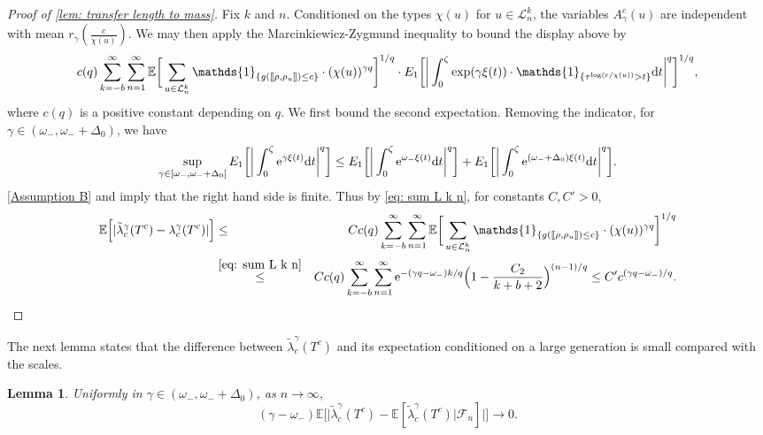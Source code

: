 \documentclass[12pt]{article}
\def\llbracket{[\hspace{-.10em} [ }
\def\rrbracket{ ] \hspace{-.10em}]}
\numberwithin{equation}{section}
\theoremstyle{plain}
\newtheorem{lem}[thm]{Lemma}
\theoremstyle{definition}
\begin{document}
\begin{proof}[Proof of \cref{lem: transfer length to mass}]
\noindent Fix $k$ and $n$. Conditioned on the types $\chi(u)$ for $u\in\mathcal{L}^k_n$, the variables $A_\gamma^c(u)$ are independent with mean $r_{\gamma}(\frac{c}{\chi(u)})$. We may then apply the Marcinkiewicz-Zygmund inequality to bound the display above by
\[
c(q)\sum^{\infty}_{k=-b}\sum^{\infty}_{n=1} \mathbb{E}\bigg[\sum_{u\in\mathcal{L}^k_n}\mathds{1}_{\{g(\llbracket \rho, \rho_u \rrbracket)\leq c\}}\cdot(\chi(u))^{\gamma q}\bigg]^{1/q} \cdot E_1\bigg[\bigg| \int^\zeta_0 \exp(\gamma\xi(t))\cdot\mathds{1}_{\{\tau^{\log(c/\chi(u))}>t\}}\mathrm{d}t \bigg|^q\bigg]^{1/q},
\]
where $c(q)$ is a positive constant depending on $q$. We first bound the second expectation. Removing the indicator, for $\gamma\in (\omega_-, \omega_- + \Delta_0)$, we have
\[
\sup_{\gamma\in[\omega_-, \omega_- + \Delta_0]}E_1\bigg[\bigg|\int^\zeta_0 \mathrm{e}^{\gamma\xi(t)}\mathrm{d}t \bigg|^q\bigg] \\ \leq  E_1\bigg[\bigg|\int^\zeta_0 \mathrm{e}^{\omega_-\xi(t)}\mathrm{d}t \bigg|^q\bigg] +  E_1\bigg[\bigg| \int^\zeta_0 \mathrm{e}^{(\omega_-+\Delta_0)\xi(t)}\mathrm{d}t \bigg|^q\bigg].
\]
\cref{Assumption B} and \cite[Lemma 9.1]{BertoinJean2024SMta}  imply that the right hand side is finite. Thus by \eqref{eq: sum L k n}, for constants $C,C'>0$,
\begin{eqnarray*}
\mathbb{E}\Big[|\tilde\lambda^{\gamma}_c(T^c)-\lambda^{\gamma}_c(T^c)|\Big]
&\leq& C c(q)\sum^{\infty}_{k=-b}\sum^{\infty}_{n=1} \mathbb{E}\bigg[ \sum_{u\in\mathcal{L}^k_n} \mathds{1}_{\{g(\llbracket\rho, \rho_u\rrbracket)\leq c\}}\cdot(\chi(u))^{\gamma q}\bigg]^{1/q}\\
&\stackrel{\eqref{eq: sum L k n}}{\leq}& Cc(q)\sum^{\infty}_{k=-b} \sum^{\infty}_{n=1} \mathrm{e}^{-(\gamma q-\omega_-)k/q}\Big(1-\frac{C_2}{k+b+2}\Big)^{(n-1)/q}
\leq C' c^{(\gamma q-\omega_-)/q}.
\end{eqnarray*}

\end{proof}

The next lemma states that the difference between $\tilde{\lambda}^{\gamma}_c(T^c)$ and its expectation conditioned on a large generation is small compared with the scales.

\begin{lem}\label{lem: approx by generation}
Uniformly in $\gamma \in (\omega_-, \omega_- + \Delta_0)$, as $n\to\infty$,
\begin{equation}\label{eq: approx by generation}
(\gamma-\omega_-)\mathbb{E}\bigg[\Big|\tilde{\lambda}^{\gamma}_c(T^c) -  \mathbb{E}[\tilde{\lambda}^{\gamma}_c(T^c)|\mathcal{F}_n]\Big|\bigg]\to 0.
\end{equation}
\end{lem}
\end{document}
